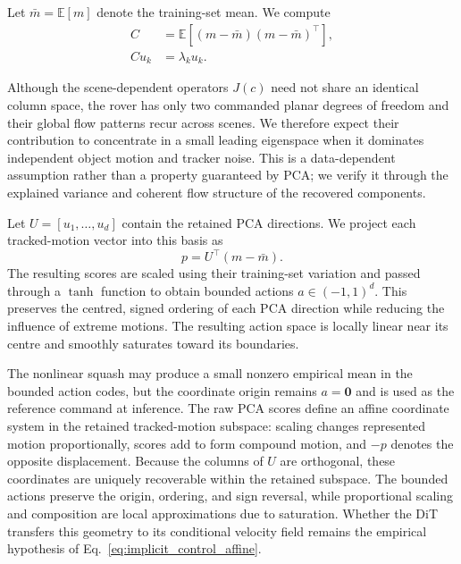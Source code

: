 \documentclass[letterpaper]{article} %
\begin{document}
Let $\bar m=\mathbb{E}[m]$ denote the training-set mean. We compute
\begin{equation}
    \begin{aligned}
        C
        &=
        \mathbb{E}
        \left[
            (m-\bar m)(m-\bar m)^\top
        \right],\\
        C u_k
        &=
        \lambda_k u_k.
    \end{aligned}
    \label{eq:motion_pca}
\end{equation}

Although the scene-dependent operators $J(c)$ need not share an identical
column space, the rover has only two commanded planar degrees of freedom and
their global flow patterns recur across scenes. We therefore expect their
contribution to concentrate in a small leading eigenspace when it dominates
independent object motion and tracker noise. This is a data-dependent
assumption rather than a property guaranteed by PCA; we verify it through
the explained variance and coherent flow structure of the recovered
components.

Let $U=[u_1,\ldots,u_d]$ contain the retained PCA directions. We project each
tracked-motion vector into this basis as
\begin{equation}
    p = U^\top(m-\bar m).
    \label{eq:pca_projection}
\end{equation}
The resulting scores are scaled using their training-set variation and passed
through a $\tanh$ function to obtain bounded actions $a\in(-1,1)^d$. This
preserves the centred, signed ordering of each PCA direction while reducing
the influence of extreme motions. The resulting action space is locally
linear near its centre and smoothly saturates toward its boundaries.

The nonlinear squash may produce a small nonzero empirical mean in the
bounded action codes, but the coordinate origin remains
$a=\mathbf{0}$ and is used as the reference command at inference. The raw
PCA scores define an affine coordinate system in the retained tracked-motion
subspace: scaling changes represented motion proportionally, scores add to
form compound motion, and $-p$ denotes the opposite displacement. Because
the columns of $U$ are orthogonal, these coordinates are uniquely recoverable
within the retained subspace. The bounded actions preserve the origin,
ordering, and sign reversal, while proportional scaling and composition are
local approximations due to saturation. Whether the DiT transfers this
geometry to its conditional velocity field remains the empirical hypothesis
of Eq.~\eqref{eq:implicit_control_affine}.
\end{document}
